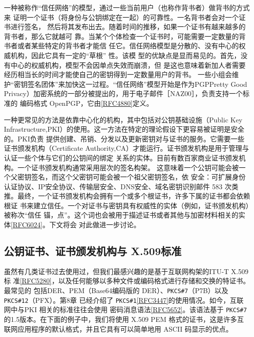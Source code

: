 一种被称作“信任网络”的模型，通过一些当前用户（也称作背书者）做背书的方式来
证明一个证书（将身份与公钥绑定在一起）的可靠性。一名背书者会对一个证书进行签名，
然后将其发布出去。随着时间的推移，如果一个证书有越来越多的背书者，那么它就越可
靠。当某个个体检查一个证书时，可能需要一定数量的背书者或者某些特定的背书者才能信
任它。信任网络模型是分散的、没有中心的权威机构，因此它具有一定的“草根” 性。该模
型的优缺点是显而易见的。首先，没有中心的权威机构，模型不会因单点失效而崩溃，但
是这也意味着新加人者需要经历相当长的时间才能使自己的密钥得到一定数量用户的背书。
一些小组会维护“密钥签名团体”来加快这一过程。“信任网络”模型开始是作为PGPPretty
Good Privacy）加密系统的一部分被提出的，用于电子邮件［NAZ00］，负责支持一个标准的
编码格式 OpenPGP，它由\href{https://www.rfc-editor.org/rfc/rfc4880}{[RFC4880]}定义。

一种更常见的方法是依靠中心化的机构，其中包括对公钥基础设施（Public Key
Infrastructure,PKI）的使用。这一方法在特定的理论假设下更容易被证明是安全的。PKI负责
提供创建、吊销、分发以及更新密钥对与证书的服务。它需要一些证书颁发机构（Certificate
Authority,CA）才能运行。证书颁发机构是用于管理与认证一些个体与它们的公钥间的绑定
关系的实体。目前有数百家商业证书颁发机构。一个证书颁发机构通常采用层次的签名构架。
这意味着一个公钥可能会被一个父密钥签名，而这个父密钥可能会被一个祖父密钥签名，依
安全：可扩展身份认证协议、IP安全协议、传输层安全、DNS安全、域名密钥识别邮件 583
次类推。最终，一个证书颁发机构会拥有一个或多个根证书，许多下属的证书都会依赖根证
书来建立信任。一个对证书与密钥具有权威性的实体（例如，证书颁发机构）被称次“信任
锚，点”。这个词也会被用于描述证书或者其他与加密材料相关的实体\href{https://www.rfc-editor.org/rfc/rfc6024}{[RFC6024]}。下文将会
对此做进一步讨论。

\subsection{公钥证书、证书颁发机构与 X.509标准}

虽然有几类证书过去使用过，但我们最感兴趣的是基于互联网构架的ITU-T X.509标
准\href{https://www.rfc-editor.org/rfc/rfc5280}{[RFC5280]}，以及任何能够以多种文件或编码格式进行存储和交换的特证书。最常见的
包括DER、PEM（Base64编码版的 DER）、\verb|PKCS#7|（P7B）以及\verb|PKCS#12|（PFX）。第8章
已经介绍了 \verb|PKCS#1|\href{https://www.rfc-editor.org/rfc/rfc3447}{[RFC3447]}的使用情况。如今，互联网中与PKI 相关的标准往往会使用
密码消息语法\href{https://www.rfc-editor.org/rfc/rfc5652}{[RFC5652]}。该语法基于 \verb|PKCS#7|的1.5版本。在下面的例子中，我们将使用
X.509 PEM 格式的证书，这是许多互联网应用程序的默认格式，并且它具有可以简单地用
ASCII 码显示的优点。

